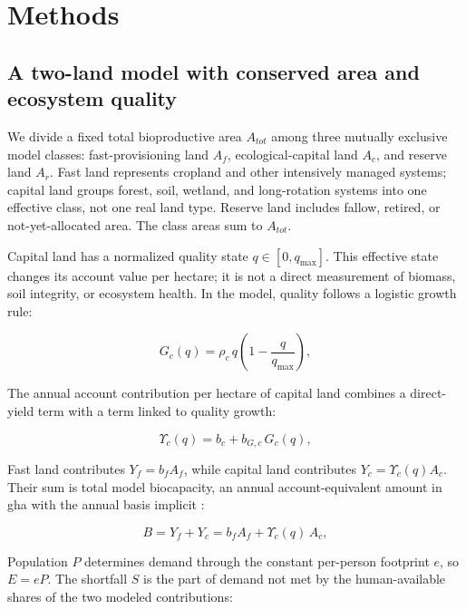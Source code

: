\documentclass[preprint,12pt,authoryear]{elsarticle}
\newcommand{\Ups}{\Upsilon_c}
\begin{document}
\section{Methods}\label{sec:model}

\subsection{A two-land model with conserved area and ecosystem quality}\label{sec:equations}

We divide a fixed total bioproductive area $A_{tot}$ among three mutually exclusive model classes: fast-provisioning land $A_f$, ecological-capital land $A_c$, and reserve land $A_r$. Fast land represents cropland and other intensively managed systems; capital land groups forest, soil, wetland, and long-rotation systems into one effective class, not one real land type. Reserve land includes fallow, retired, or not-yet-allocated area. The class areas sum to $A_{tot}$.

Capital land has a normalized quality state $q\in[0,q_{\max}]$. This effective state changes its account value per hectare; it is not a direct measurement of biomass, soil integrity, or ecosystem health. In the model, quality follows a logistic growth rule:

\begin{equation}\label{eq:Gc}
G_c(q)=\rho_c\,q\left(1-\frac{q}{q_{\max}}\right),
\end{equation}

The annual account contribution per hectare of capital land combines a direct-yield term with a term linked to quality growth:

\begin{equation}\label{eq:Ups}
\Ups(q)=b_c+b_{G,c}\,G_c(q),
\end{equation}

Fast land contributes $Y_f=b_fA_f$, while capital land contributes $Y_c=\Ups(q)A_c$. Their sum is total model biocapacity, an annual account-equivalent amount in gha with the annual basis implicit \citep{GFNStandards2009,GFNGuidebook2019}:

\begin{equation}\label{eq:B}
B=Y_f+Y_c=b_f A_f+\Ups(q)\,A_c ,
\end{equation}

Population $P$ determines demand through the constant per-person footprint $e$, so $E=eP$. The shortfall $S$ is the part of demand not met by the human-available shares of the two modeled contributions:
\end{document}
